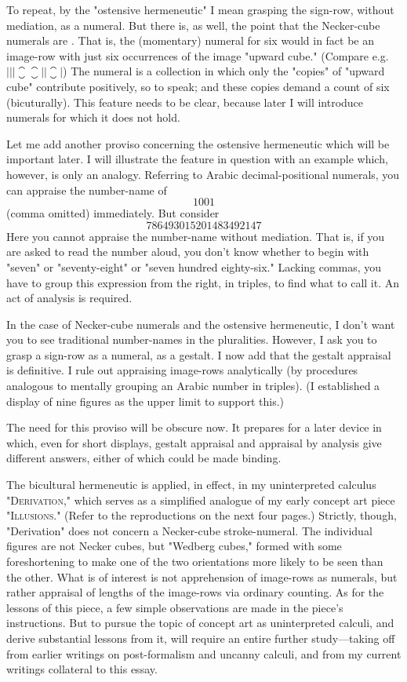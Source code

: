 To repeat, by the "ostensive hermeneutic" I mean grasping the 
sign-row, without mediation, as a numeral. But there is, as well, the 
point that the Necker-cube numerals are . That is, 
the (momentary) numeral for six would in fact be an image-row with 
just six occurrences of the image "upward cube." (Compare e.g. 
$|||\closure\closure||\closure|$) The numeral is a collection in which only the "copies" of 
"upward cube" contribute positively, so to speak; and these copies 
demand a count of six (bicuturally). This feature needs to be clear, 
because later I will introduce numerals for which it does not hold. 

Let me add another proviso concerning the ostensive hermeneutic 
which will be important later. I will illustrate the feature in question 
with an example which, however, is only an analogy. Referring to 
Arabic decimal-positional numerals, you can appraise the number-name of 
$$1001$$
(comma omitted) immediately. But consider 
$$786493015201483492147$$
Here you cannot appraise the number-name without mediation. That 
is, if you are asked to read the number aloud, you don't know whether 
to begin with "seven" or "seventy-eight" or "seven hundred eighty-six." 
Lacking commas, you have to group this expression from the right, in 
triples, to find what to call it. An act of analysis is required. 

In the case of Necker-cube numerals and the ostensive hermeneutic, 
I don't want you to see traditional number-names in the pluralities. 
However, I ask you to grasp a sign-row as a numeral, as a gestalt. I now 
add that the gestalt appraisal is definitive. I rule out appraising image-rows 
analytically (by procedures analogous to mentally grouping an 
Arabic number in triples). (I established a display of nine figures as the 
upper limit to support this.) 

The need for this proviso will be obscure now. It prepares for a 
later device in which, even for short displays, gestalt appraisal and 
appraisal by analysis give different answers, either of which could be 
made binding. 

\breatk

The bicultural hermeneutic is applied, in effect, in my uninterpreted 
calculus \textsc{"Derivation,"} which serves as a simplified analogue of 
my early concept art piece \textsc{"Illusions."} (Refer to the reproductions on 
the next four pages.) Strictly, though, "Derivation" does not concern a 
Necker-cube stroke-numeral. The individual figures are not Necker 
cubes, but "Wedberg cubes," formed with some foreshortening to make 
one of the two orientations more likely to be seen than the other. What 
is of interest is not apprehension of image-rows as numerals, but rather 
appraisal of lengths of the image-rows via ordinary counting. As for the 
lessons of this piece, a few simple observations are made in the piece's 
instructions. But to pursue the topic of concept art as uninterpreted 
calculi, and derive substantial lessons from it, will require an entire 
further study---taking off from earlier writings on post-formalism and 
uncanny calculi, and from my current writings collateral to this essay. 


